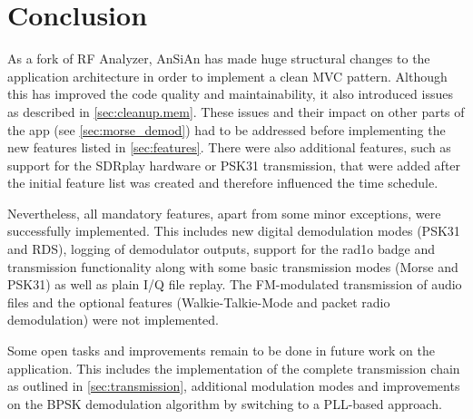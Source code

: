 \chapter{Conclusion\label{ch:conclusion}}

As a fork of RF Analyzer, \ac{AnSiAn} has made huge structural changes to the
application architecture in order to implement a clean \ac{MVC} pattern.
Although this has improved the code quality and maintainability, it also
introduced issues as described in \autoref{sec:cleanup.mem}. These issues and
their impact on other parts of the app (see \autoref{sec:morse_demod}) had to
be addressed before implementing the new features listed in
\autoref{sec:features}. There were also additional features, such as support for
the SDRplay hardware or PSK31 transmission, that were added after the initial
feature list was created and therefore influenced the time schedule.

Nevertheless, all mandatory features, apart from some minor exceptions,
were successfully implemented. This includes new digital demodulation
modes (PSK31 and RDS), logging of demodulator outputs, support for the
rad1o badge and transmission functionality along with some basic transmission
modes (Morse and PSK31) as well as plain I/Q file replay. The \ac{FM}-modulated transmission of audio files and the optional features (Walkie-Talkie-Mode and packet radio demodulation) were not implemented.

Some open tasks and improvements remain to be done in future work on the
application. This includes the implementation of the complete transmission
chain as outlined in \autoref{sec:transmission}, additional modulation modes
and improvements on the \ac{BPSK} demodulation algorithm by switching to
a \ac{PLL}-based approach.
